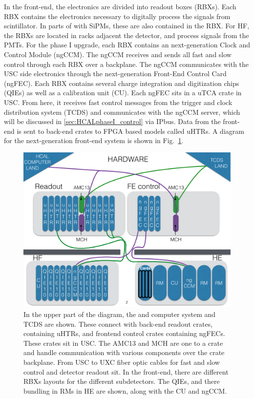 In the front-end, the \HCAL electronics are divided into readout boxes (RBXs). Each RBX contains the electronics necessary to digitally process the signals from scintillator. In parts of \HCAL with SiPMs, these are also contained in the RBX. For HF, the RBXs are located in racks adjacent the detector, and process signals from the PMTs. For the \HCAL phase I upgrade, each RBX contains an next-generation Clock and Control Module (ngCCM).  The ngCCM receives and sends all fast and slow control through each RBX over a backplane.  The ngCCM communicates with the USC side electronics through the next-generation Front-End Control Card (ngFEC).  Each RBX contains several charge integration and digitization chips (QIEs) as well as a calibration unit (CU). Each ngFEC sits in a uTCA crate in USC.  From here, it receives fast control messages from the trigger and clock distribution system (TCDS) and communicates with the ngCCM server, which will be discussed in \ref{sec:HCALphaseI_control} via IPbus.  Data from the front-end is sent to back-end crates to FPGA based models called uHTRs. A diagram for the next-generation front-end system is shown in Fig.~\ref{fig:HCALngFElayout}.
\begin{figure}[!tp]
    \centering
    \includegraphics[width=\textwidth]{figures/HCALngFElayout.pdf}
    \caption[
       \HCAL Phase I Upgrade Control and Readout Layout.
    ]{
        In the upper part of the diagram, the \HCAL and computer system and TCDS are shown.  These connect with back-end readout crates, containing uHTRs, and frontend control crates containing ngFECs.  These crates sit in USC.  The AMC13 and MCH are one to a crate and handle communication with various components over the crate backplane. From USC to UXC fiber optic cables for fast and slow control and detector readout sit.  In the front-end, there are different RBXs layouts for the different \HCAL subdetectors.  The QIEs, and there bundling in RMs in HE are shown, along with the CU and ngCCM.
    }
    \label{fig:HCALngFElayout}
\end{figure}
